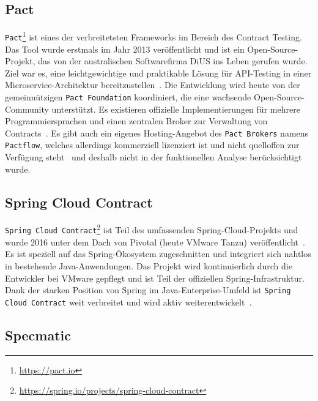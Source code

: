 \subsection*{Pact}

\texttt{Pact}\footnote{\url{https://pact.io}} ist eines der verbreitetsten Frameworks im Bereich des Contract Testing.
Das Tool wurde erstmals im Jahr 2013 veröffentlicht und ist ein Open-Source-Projekt, das von der australischen Softwarefirma DiUS ins Leben gerufen wurde.
Ziel war es, eine leichtgewichtige und praktikable Lösung für \gls{API}-Testing in einer Microservice-Architektur bereitzustellen~\cite{pactfoundationPactDocs2022}.
Die Entwicklung wird heute von der gemeinnützigen \texttt{Pact Foundation} koordiniert, die eine wachsende Open-Source-Community unterstützt.
Es existieren offizielle Implementierungen für mehrere Programmiersprachen und einen zentralen Broker zur Verwaltung von Contracts~\cite{pactfoundationPactDocs2022}.
Es gibt auch ein eigenes Hosting-Angebot des \texttt{Pact Brokers} namens \texttt{Pactflow}, welches allerdings kommerziell lizenziert ist und nicht quelloffen zur Verfügung steht~\cite{MicroservicesAPITesting} und deshalb nicht in der funktionellen Analyse berücksichtigt wurde.

\subsection*{Spring Cloud Contract}

\texttt{Spring Cloud Contract}\footnote{\url{https://spring.io/projects/spring-cloud-contract}} ist Teil des umfassenden \gls{Spring}-Cloud-Projekts und wurde 2016 unter dem Dach von Pivotal (heute VMware Tanzu) veröffentlicht~\cite{SpringCloudContract}.
Es ist speziell auf das \gls{Spring}-Ökosystem zugeschnitten und integriert sich nahtlos in bestehende Java-Anwendungen.
Das Projekt wird kontinuierlich durch die Entwickler bei VMware gepflegt und ist Teil der offiziellen \gls{Spring}-Infrastruktur.
Dank der starken Position von \gls{Spring} im Java-Enterprise-Umfeld ist \texttt{Spring Cloud Contract} weit verbreitet und wird aktiv weiterentwickelt~\cite{SpringCloudContracta}.

\subsection*{Specmatic}

